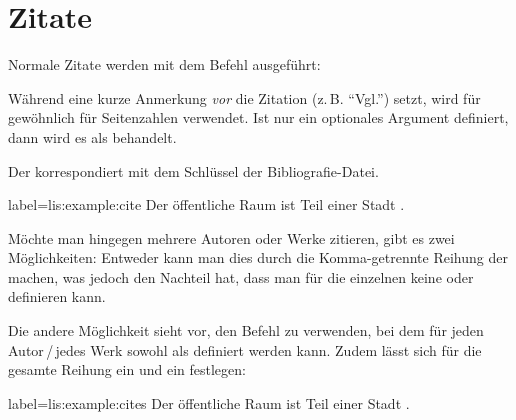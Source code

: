 \section{Zitate}\label{sec:zitate}\label{lit:cite-befehle}

Normale Zitate werden mit dem Befehl  ausgeführt:

Während   eine kurze Anmerkung \emph{vor} die Zitation (z.\,B. \enquote{Vgl.}) setzt, 
wird   für gewöhnlich für Seitenzahlen verwendet.
Ist nur ein optionales Argument definiert, 
dann wird es als  behandelt.
Der  korrespondiert mit dem Schlüssel der Bibliografie-Datei.

\begin{lfgwexample}{label={lis:example:cite}}
Der öffentliche Raum ist Teil einer Stadt \cite{Osland2016}.
\end{lfgwexample}

Möchte man hingegen mehrere Autoren oder Werke zitieren, 
gibt es zwei Möglichkeiten:
Entweder kann man dies durch die Komma-getrennte Reihung der  machen,
was jedoch den Nachteil hat, dass man für die einzelnen  keine  oder  definieren kann.

Die andere Möglichkeit sieht vor, den Befehl  zu verwenden, 
bei dem für jeden Autor\,/\,jedes Werk sowohl  als  definiert werden kann.
Zudem lässt sich für die gesamte Reihung ein  und ein  festlegen:
\begin{lfgwexample}{label={lis:example:cites}}
Der öffentliche Raum ist Teil einer Stadt \cites(vgl.)(){Osland2016}{Evangelidis2014}.
\end{lfgwexample}
 

